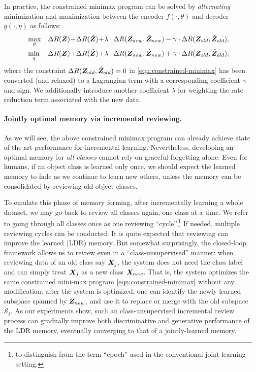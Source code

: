 \documentclass[\toplevelprefix/book-main.tex]{subfiles}
\begin{document}
In practice, the constrained minimax program can be solved by {\em alternating}  minimization and maximization between the encoder $f(\cdot, \theta)$ and decoder $g(\cdot, \eta)$ as follows:
\begin{eqnarray}
&\max_\theta  &\Delta{R(\Z)}\!+\!\Delta{R(\hat{\Z})}\!+\!\lambda\cdot  \Delta{R(\Z_{new},\hat{\Z}_{new})} - \gamma\cdot \Delta{R(\Z_{old},\hat{\Z}_{old})}, \label{eqn:relaxed-max}\\ 
&\min_\eta &\Delta{R(\Z)}\!+\!\Delta{R(\hat{\Z})}\!+\!\lambda\cdot \Delta{R(\Z_{new},\hat{\Z}_{new})} + \gamma\cdot \Delta{R(\Z_{old},\hat{\Z}_{old})}; \label{eqn:relaxed-min}
\end{eqnarray}
where the constraint $\Delta R(\bm{Z}_{old},\hat{\bm{Z}}_{old}) = 0$ in \eqref{eqn:constrained-minimax} has been converted (and relaxed) to a Lagrangian term with a corresponding coefficient $\gamma$ and sign. We additionally introduce another coefficient $\lambda$ for weighting the rate reduction term associated with the new data. %



\paragraph{Jointly optimal memory via incremental reviewing.} 
As we will see, the above constrained minimax program can already achieve state of the art performance for incremental learning. Nevertheless, developing an optimal memory for {\em all classes} cannot rely on graceful forgetting alone. Even for humans, if an object class is learned only once, we should expect the learned memory to fade as we continue to learn new others, unless the memory can be consolidated by reviewing old object classes. %

To emulate this phase of memory forming, after incrementally learning a whole dataset, we may go back to review all classes again, one class at a time. We refer to going through all classes once as one reviewing ``cycle''.\footnote{to distinguish from the term ``epoch'' used in the conventional joint learning setting.} If needed, multiple reviewing cycles can be conducted. It is quite expected that reviewing can improve the learned (LDR) memory. But somewhat surprisingly, the closed-loop framework allows us to review even in a ``{class-unsupervised}'' manner: when reviewing data of an old class say $\bm{X}_j$, the system does not need the class label and can simply treat $\bm{X}_j$ as a new class $\bm{X}_{new}$. That is, the system optimizes the same constrained mini-max program \eqref{eqn:constrained-minimax} without any modification; after the system is optimized, one can identify the newly learned subspace spanned by $\bm{Z}_{new}$, and use it to replace or merge with the old subspace $\mathcal{S}_j$. As our experiments show, such an class-unsupervised incremental review process can gradually improve both discriminative and generative performance of the LDR memory, eventually converging to that of a jointly-learned memory.
\end{document}
